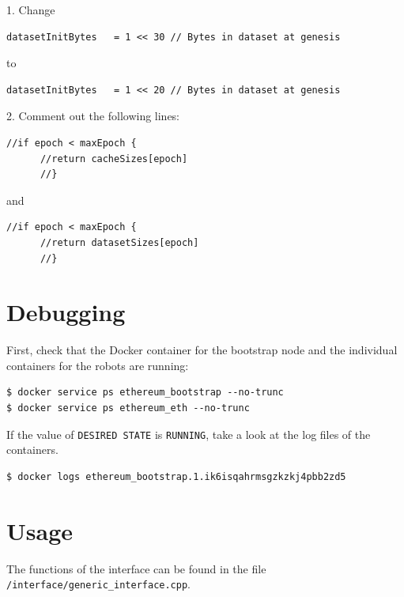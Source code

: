 \documentclass{article}
\begin{document}
1. Change
\begin{verbatim}
datasetInitBytes   = 1 << 30 // Bytes in dataset at genesis
\end{verbatim}
to
\begin{verbatim}
datasetInitBytes   = 1 << 20 // Bytes in dataset at genesis
\end{verbatim}
2. Comment out the following lines:
\begin{verbatim}
//if epoch < maxEpoch {
	  //return cacheSizes[epoch]
	  //}
\end{verbatim}
        and        
\begin{verbatim}
//if epoch < maxEpoch {
	  //return datasetSizes[epoch]
	  //}
\end{verbatim}


\section{Debugging}

First, check that the Docker container for the bootstrap node and the
individual containers for the robots are running:
%
\begin{verbatim}
$ docker service ps ethereum_bootstrap --no-trunc
$ docker service ps ethereum_eth --no-trunc
\end{verbatim}
%


If the value of \verb|DESIRED STATE| is \verb|RUNNING|, take a look at
the log files of the containers.

\begin{verbatim}
$ docker logs ethereum_bootstrap.1.ik6isqahrmsgzkzkj4pbb2zd5
\end{verbatim}

\section{Usage}

The functions of the interface can be found in the file
\verb|/interface/generic_interface.cpp|.
\end{document}
